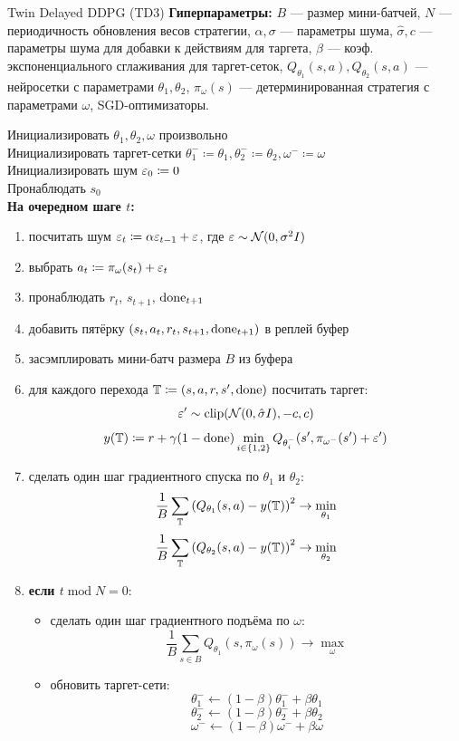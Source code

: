 \begin{algorithm}[label = TD3]{Twin Delayed DDPG (TD3)}
\textbf{Гиперпараметры:} $B$ --- размер мини-батчей, $N$ --- периодичность обновления весов стратегии, $\alpha, \sigma$ --- параметры шума, $\hat{\sigma}, c$ --- параметры шума для добавки к действиям для таргета, $\beta$ --- коэф. экспоненциального сглаживания для таргет-сеток, $Q_{\theta_1}(s, a), Q_{\theta_2}(s, a)$ --- нейросетки с параметрами $\theta_1, \theta_2$, $\pi_{\omega}(s)$ --- детерминированная стратегия с параметрами $\omega$, SGD-оптимизаторы.

\vspace{0.3cm}
Инициализировать $\theta_1, \theta_2, \omega$ произвольно \\
Инициализировать таргет-сетки $\theta_1^- \coloneqq \theta_1, \theta_2^- \coloneqq \theta_2, \omega^- \coloneqq \omega$ \\
Инициализировать шум $\varepsilon_0 \coloneqq 0$ \\
Пронаблюдать $s_0$ \\
\textbf{На очередном шаге $t$:}
\begin{enumerate}
    \item посчитать шум $\varepsilon_{t} \coloneqq \alpha \varepsilon_{t-1} + \varepsilon$, где $\varepsilon \sim \mathcal{N}(0, \sigma^2 I)$
    \item выбрать $a_t \coloneqq \pi_\omega(s_t) + \varepsilon_{t}$
    \item пронаблюдать $r_t$,  $s_{t+1}$, $\mathrm{done}_{t+1}$
    \item добавить пятёрку $(s_t, a_t, r_t, s_{t+1}, \mathrm{done}_{t+1})$ в реплей буфер
    \item засэмплировать мини-батч размера $B$ из буфера
    \item для каждого перехода $\mathbb{T} \coloneqq (s, a, r, s', \mathrm{done})$ посчитать таргет:
    $$\varepsilon' \sim \mathrm{clip}(\mathcal{N}(0, \hat{\sigma}I), -c, c)$$
    $$y(\mathbb{T} ) \coloneqq r + \gamma (1 - \mathrm{done}) \min_{i \in \{1, 2\}}Q_{\theta_i^{-}}(s', \pi_{\omega^{-}}(s') + \varepsilon')$$
    \item сделать один шаг градиентного спуска по $\theta_1$ и $\theta_2$:
    $$\frac{1}{B}\sum_{\mathbb{T}} \left( Q_{\theta_1}(s, a) - y(\mathbb{T} ) \right) ^2 \to \min_{\theta_1}$$
    $$\frac{1}{B}\sum_{\mathbb{T}} \left( Q_{\theta_2}(s, a) - y(\mathbb{T} ) \right) ^2 \to \min_{\theta_2}$$
    \item \textbf{если $t \operatorname{mod} N = 0$}:
    \begin{itemize}
        \item сделать один шаг градиентного подъёма по $\omega$:
        $$\frac{1}{B}\sum_{s \in B} Q_{\theta_1}(s, \pi_\omega(s)) \to \max_{\omega}$$
        \item обновить таргет-сети:
        $$\theta^{-}_1 \gets (1 - \beta) \theta^{-}_1 + \beta \theta_1$$
        $$\theta^{-}_2 \gets (1 - \beta) \theta^{-}_2 + \beta \theta_2$$
        $$\omega^{-}   \gets (1 - \beta) \omega^{-}   + \beta \omega$$
    \end{itemize}
\end{enumerate}
\end{algorithm}


